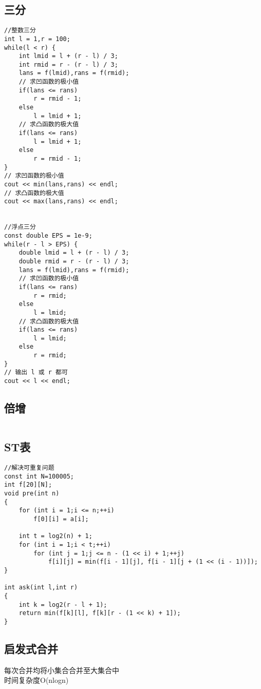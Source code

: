 \documentclass[twocolumn,a4]{article}
\begin{document}
\subsection{三分}
\begin{lstlisting}
//整数三分
int l = 1,r = 100;
while(l < r) {
    int lmid = l + (r - l) / 3;
    int rmid = r - (r - l) / 3;
    lans = f(lmid),rans = f(rmid);
    // 求凹函数的极小值
    if(lans <= rans) 
        r = rmid - 1;
    else 
        l = lmid + 1;
    // 求凸函数的极大值
    if(lans <= rans) 
        l = lmid + 1;
    else 
        r = rmid - 1;
}
// 求凹函数的极小值
cout << min(lans,rans) << endl;
// 求凸函数的极大值
cout << max(lans,rans) << endl;


//浮点三分
const double EPS = 1e-9;
while(r - l > EPS) {
    double lmid = l + (r - l) / 3;
    double rmid = r - (r - l) / 3;
    lans = f(lmid),rans = f(rmid);
    // 求凹函数的极小值
    if(lans <= rans) 
        r = rmid;
    else 
        l = lmid;
    // 求凸函数的极大值
    if(lans <= rans) 
        l = lmid;
    else 
        r = rmid;
}
// 输出 l 或 r 都可
cout << l << endl;
\end{lstlisting}

\subsection{倍增}
\begin{lstlisting}

\end{lstlisting}

\subsection{ST表}
\begin{lstlisting}
//解决可重复问题
const int N=100005;
int f[20][N];
void pre(int n)
{
    for (int i = 1;i <= n;++i)
        f[0][i] = a[i];
 
    int t = log2(n) + 1;
    for (int i = 1;i < t;++i)
        for (int j = 1;j <= n - (1 << i) + 1;++j)
            f[i][j] = min(f[i - 1][j], f[i - 1][j + (1 << (i - 1))]);
}

int ask(int l,int r)
{
    int k = log2(r - l + 1);
    return min(f[k][l], f[k][r - (1 << k) + 1]);
}
\end{lstlisting}

\subsection{启发式合并}
\begin{large}
    每次合并均将小集合合并至大集合中\\
    时间复杂度O(nlogn)\\
\end{large}
\end{document}
